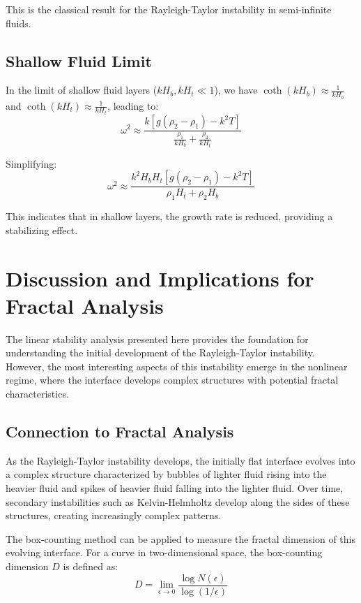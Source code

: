 \documentclass[12pt,a4paper]{article}
\begin{document}
This is the classical result for the Rayleigh-Taylor instability in semi-infinite fluids.

\subsection{Shallow Fluid Limit}
In the limit of shallow fluid layers ($kH_b, kH_t \ll 1$), we have $\coth(kH_b) \approx \frac{1}{kH_b}$ and $\coth(kH_t) \approx \frac{1}{kH_t}$, leading to:
\begin{equation}
\omega^2 \approx \frac{k[g(\rho_2 - \rho_1) - k^2T]}{\frac{\rho_1}{kH_b} + \frac{\rho_2}{kH_t}}
\end{equation}

Simplifying:
\begin{equation}
\omega^2 \approx \frac{k^2H_bH_t[g(\rho_2 - \rho_1) - k^2T]}{\rho_1H_t + \rho_2H_b}
\end{equation}

This indicates that in shallow layers, the growth rate is reduced, providing a stabilizing effect.

\section{Discussion and Implications for Fractal Analysis}
The linear stability analysis presented here provides the foundation for understanding the initial development of the Rayleigh-Taylor instability. However, the most interesting aspects of this instability emerge in the nonlinear regime, where the interface develops complex structures with potential fractal characteristics.

\subsection{Connection to Fractal Analysis}
As the Rayleigh-Taylor instability develops, the initially flat interface evolves into a complex structure characterized by bubbles of lighter fluid rising into the heavier fluid and spikes of heavier fluid falling into the lighter fluid. Over time, secondary instabilities such as Kelvin-Helmholtz develop along the sides of these structures, creating increasingly complex patterns.

The box-counting method can be applied to measure the fractal dimension of this evolving interface. For a curve in two-dimensional space, the box-counting dimension $D$ is defined as:
\begin{equation}
D = \lim_{\epsilon \to 0} \frac{\log N(\epsilon)}{\log(1/\epsilon)}
\end{equation}
\end{document}
